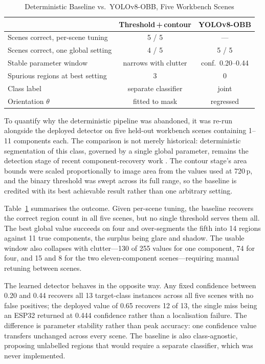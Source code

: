 \documentclass[conference]{IEEEtran}
\begin{document}
\begin{table}[b]
  \caption{Deterministic Baseline vs.\ YOLOv8-OBB, Five Workbench Scenes}
  \label{tab:baseline}
  \centering
  \footnotesize
  \begin{tabular}{@{}lcc@{}}
    \toprule
                                        & Threshold\,+\,contour & YOLOv8-OBB \\
    \midrule
    Scenes correct, per-scene tuning    & 5 / 5                 & --- \\
    Scenes correct, one global setting  & 4 / 5                 & 5 / 5 \\
    Stable parameter window             & narrows with clutter  & conf.\ 0.20--0.44 \\
    Spurious regions at best setting    & 3                     & 0 \\
    Class label                         & separate classifier   & joint \\
    Orientation $\theta$                & fitted to mask        & regressed \\
    \bottomrule
  \end{tabular}
\end{table}

To quantify why the deterministic pipeline was abandoned, it was re-run alongside the deployed detector on five held-out workbench scenes containing 1--11 components each. The comparison is not merely historical: deterministic segmentation of this class, governed by a single global parameter, remains the detection stage of recent component-recovery work \cite{chand2022}. The contour stage's area bounds were scaled proportionally to image area from the values used at 720\,p, and the binary threshold was swept across its full range, so the baseline is credited with its best achievable result rather than one arbitrary setting.

Table~\ref{tab:baseline} summarises the outcome. Given per-scene tuning, the baseline recovers the correct region count in all five scenes, but no single threshold serves them all. The best global value succeeds on four and over-segments the fifth into 14 regions against 11 true components, the surplus being glare and shadow. The usable window also collapses with clutter---130 of 255 values for one component, 74 for four, and 15 and 8 for the two eleven-component scenes---requiring manual retuning between scenes.

The learned detector behaves in the opposite way. Any fixed confidence between 0.20 and 0.44 recovers all 13 target-class instances across all five scenes with no false positives; the deployed value of 0.65 recovers 12 of 13, the single miss being an ESP32 returned at 0.444 confidence rather than a localisation failure. The difference is parameter stability rather than peak accuracy: one confidence value transfers unchanged across every scene. The baseline is also class-agnostic, proposing unlabelled regions that would require a separate classifier, which was never implemented.
\end{document}

